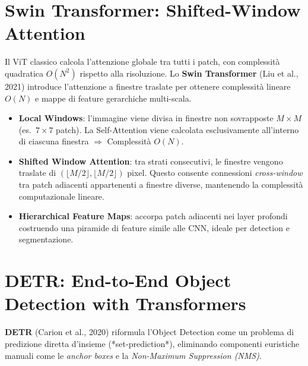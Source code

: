 \documentclass[12pt, a4paper]{report}
\begin{document}
\section{Swin Transformer: Shifted-Window Attention}

Il ViT classico calcola l'attenzione globale tra tutti i patch, con complessità
quadratica $O(N^2)$ rispetto alla risoluzione. Lo \textbf{Swin Transformer} (Liu et al.,
2021) introduce l'attenzione a finestre traslate per ottenere complessità lineare $O(N)$
e mappe di feature gerarchiche multi-scala.

\begin{propbox}
\begin{itemize}
  \item \textbf{Local Windows}: l'immagine viene divisa in finestre non sovrapposte
        $M \times M$ (es.\ $7 \times 7$ patch). La Self-Attention viene calcolata
        esclusivamente all'interno di ciascuna finestra $\Rightarrow$ Complessità $O(N)$.
  \item \textbf{Shifted Window Attention}: tra strati consecutivi, le finestre
        vengono traslate di $(\lfloor M/2 \rfloor, \lfloor M/2 \rfloor)$ pixel. Questo
        consente connessioni \emph{cross-window} tra patch adiacenti appartenenti a
        finestre diverse, mantenendo la complessità computazionale lineare.
  \item \textbf{Hierarchical Feature Maps}: accorpa patch adiacenti nei layer profondi
        costruendo una piramide di feature simile alle CNN, ideale per detection e segmentazione.
\end{itemize}
\end{propbox}

\section{DETR: End-to-End Object Detection with Transformers}

\textbf{DETR} (Carion et al., 2020) riformula l'Object Detection come un problema di
predizione diretta d'insieme (*set-prediction*), eliminando componenti euristiche
manuali come le \emph{anchor boxes} e la \emph{Non-Maximum Suppression (NMS)}.
\end{document}
